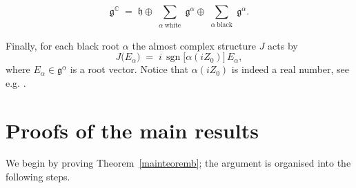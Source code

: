 \documentclass[reqno]{amsart}
\newcommand{\C}{\mathds{C}}
\begin{document}

\begin{equation}\label{tcblack}
   \mathfrak{g}^{\C} \;=\; 
\mathfrak{h}\oplus\sum_{\substack{\alpha \ \text{white}}} \mathfrak{g}^{\alpha}\oplus 
\sum_{\substack{\alpha \ \text{black}}} \mathfrak{g}^{\alpha}.
\end{equation}


Finally, for each black root $\alpha$ the almost complex structure \(J\) acts by
\begin{equation}\label{defJ}
J\!\bigl(E_\alpha\bigr)
  \;=\;
  i\,\operatorname{sgn}\!\bigl[\alpha(i Z_0)\bigr]\,E_\alpha,
\end{equation}
where \(E_{\alpha}\in\mathfrak{g}^{\alpha}\) is a root vector.
Notice that  
$\alpha(i Z_0)$ is indeed  a real number, see e.g.  \cite[p. 254]{Knapp2013lie}.





\section{Proofs of the main results}\label{proofs}
We begin by proving  Theorem~\ref{mainteoremb}; the argument is organised into the following steps.
\end{document}
